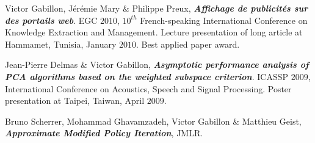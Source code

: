  Victor Gabillon, Jérémie Mary $\&$ Philippe Preux, \textbf{ \emph{Affichage de publicités sur des portails web}}. EGC $2010$, $10^{th}$ French-speaking International Conference on Knowledge Extraction and Management. Lecture presentation of long article at Hammamet, Tunisia, January $2010$. Best applied paper award.

 
 Jean-Pierre Delmas $\&$ Victor Gabillon,\textbf{ \emph{Asymptotic performance analysis of PCA algorithms based on the weighted subspace criterion}}.  ICASSP $2009$, International Conference on Acoustics, Speech and Signal Processing. Poster presentation at Taipei, Taiwan, April $2009$. 
   

  Bruno Scherrer, Mohammad Ghavamzadeh, Victor Gabillon $\&$ Matthieu Geist, \textbf{\emph{Approximate Modified Policy Iteration}}, JMLR.

